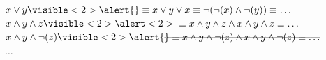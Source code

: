 \documentclass{beamer}
\newcommand{\AND}{\land}
\newcommand{\OR}{\lor}
\newcommand{\NOT}{\lnot}
\begin{document}
{  $x \OR y
  \visible<2>{\alert{\rlap{------------------------------------------------}}}
  \equiv x \OR y \OR x
  \equiv \NOT(\NOT(x) \AND \NOT(y))
  \equiv \ldots $\\

  $x \AND y \AND z
  \visible<2>{\alert<2>{\rlap{---------------------------------------}}}
  \equiv x \AND y \AND z \AND x \AND y \AND z \equiv \ldots $\\
  
  $x \AND y \AND \NOT(z)
  \visible<2>{\alert{\rlap{------------------------------------------------}}}
  \equiv x \AND y \AND \NOT(z) \AND x \AND y \AND \NOT(z) \equiv \ldots $\\

  $\ldots$\\

  \pause
}

\end{document}
